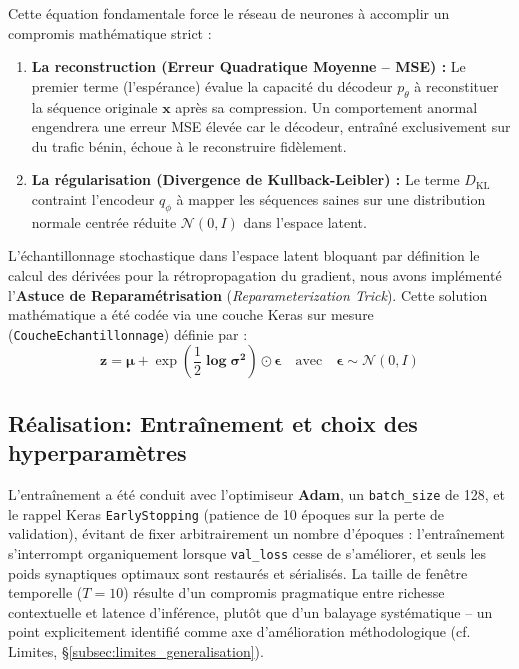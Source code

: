 Cette équation fondamentale force le réseau de neurones à accomplir un compromis mathématique strict :
\begin{enumerate}
    \item \textbf{La reconstruction (Erreur Quadratique Moyenne -- MSE) :} Le premier terme (l'espérance) évalue la capacité du décodeur $p_\theta$ à reconstituer la séquence originale $\mathbf{x}$ après sa compression. Un comportement anormal engendrera une erreur MSE élevée car le décodeur, entraîné exclusivement sur du trafic bénin, échoue à le reconstruire fidèlement.
    \item \textbf{La régularisation (Divergence de Kullback-Leibler) :} Le terme $D_{\text{KL}}$ contraint l'encodeur $q_\phi$ à mapper les séquences saines sur une distribution normale centrée réduite $\mathcal{N}(0, I)$ dans l'espace latent.
\end{enumerate}

L'échantillonnage stochastique dans l'espace latent bloquant par définition le calcul des dérivées pour la rétropropagation du gradient, nous avons implémenté l'\textbf{Astuce de Reparamétrisation} (\textit{Reparameterization Trick}). Cette solution mathématique a été codée via une couche Keras sur mesure (\texttt{CoucheEchantillonnage}) définie par :
\begin{equation}
\mathbf{z} = \boldsymbol{\mu} + \exp\left(\frac{1}{2} \boldsymbol{\log\sigma^2}\right) \odot \boldsymbol{\epsilon} \quad \text{avec} \quad \boldsymbol{\epsilon} \sim \mathcal{N}(0,I)
\end{equation}

\subsection{Réalisation: Entraînement et choix des hyperparamètres}
\label{subsec:fine_tuning}
L'entraînement a été conduit avec l'optimiseur \textbf{Adam}, un \texttt{batch\_size} de 128, et le rappel Keras \texttt{EarlyStopping} (patience de 10 époques sur la perte de validation), évitant de fixer arbitrairement un nombre d'époques : l'entraînement s'interrompt organiquement lorsque \texttt{val\_loss} cesse de s'améliorer, et seuls les poids synaptiques optimaux sont restaurés et sérialisés. La taille de fenêtre temporelle ($T=10$) résulte d'un compromis pragmatique entre richesse contextuelle et latence d'inférence, plutôt que d'un balayage systématique -- un point explicitement identifié comme axe d'amélioration méthodologique (cf. Limites, \S\ref{subsec:limites_generalisation}).

